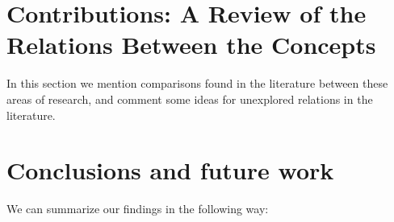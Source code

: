 \documentclass{article}
\begin{document}
\section{Contributions: A Review of the Relations Between the Concepts}\label{sec:theoRef2}

In this section we mention comparisons found in the literature between these areas of research, and comment some ideas for unexplored relations in the literature.



\section{Conclusions and future work}\label{sec:concsFuture}

We can summarize our findings in the following way:
\end{document}
